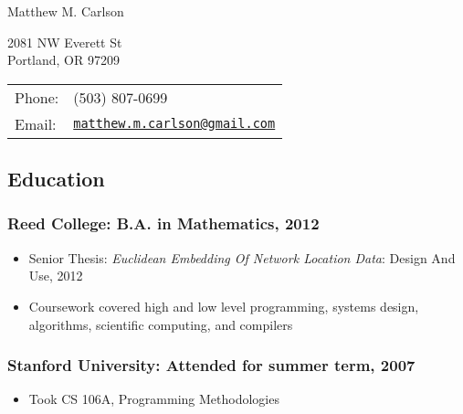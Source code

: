 \documentclass[letterpaper]{article}
\def\name{Matthew M. Carlson}%
\begin{document}
{\huge \name}%
\vspace{0.25in}

\begin{minipage}{0.45\linewidth}
	2081 NW Everett St \\
	Portland, OR 97209
\end{minipage}
\begin{minipage}{0.45\linewidth}
	\begin{tabular}{ll}
	Phone: & (503) 807-0699 \\
	Email: & \href{mailto:matthew.m.carlson@gmail.com}{\tt matthew.m.carlson@gmail.com} \\
  \end{tabular}
\end{minipage}





\subsection*{Education}

\subsubsection*{Reed College: B.A. in Mathematics, 2012}
	\begin{itemize}
        \item Senior Thesis: \textit{Euclidean Embedding Of Network Location Data}: Design And Use, 2012
        \item Coursework covered high and low level programming, systems design, algorithms, scientific computing, and compilers 
	\end{itemize}
\subsubsection*{Stanford University: Attended for summer term, 2007}
  \begin{itemize}
        \item Took CS 106A, Programming Methodologies
  \end{itemize}
\end{document}
